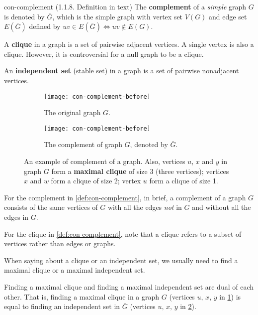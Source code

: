 \documentclass[../src/handouts/main.tex]{subfiles}
\begin{document}
\begin{definition}{}{con-complement}
  (1.1.8. Definition in text)
  The \textbf{complement} of a \textit{simple} graph $G$ is denoted by $\bar G$, which is the simple graph with vertex set $V(G)$ and edge set $E(\bar G)$ defined by $uv \in E(\bar G) \iff uv \notin E(G)$.

  A \textbf{clique} in a graph is a set of pairwise adjacent vertices. A single vertex is also a clique. However, it is controversial for a null graph to be a clique.

  An \textbf{independent set} (stable set) in a graph is a set of pairwise nonadjacent vertices.
\end{definition}

\begin{figure}[ht]
  \centering
  \begin{subfigure}[t]{.3\textwidth}
    \centering
    \texttt{[image: con-complement-before]}
    \caption{The original graph $G$.}
    \label{fig:con-complement-before}
  \end{subfigure}
  \hspace{.1\textwidth}
  \begin{subfigure}[t]{.3\textwidth}
    \centering
    \texttt{[image: con-complement-before]}
    \caption{The complement of graph $G$, denoted by $\bar G$.}
    \label{fig:con-complement-after}
  \end{subfigure}
  \caption{An example of complement of a graph. Also, vertices $u$, $x$ and $y$ in graph $G$ form a \textbf{maximal clique} of size 3 (three vertices); vertices $x$ and $w$ form a clique of size 2; vertex $u$ form a clique of size 1.}
  \label{fig:con-complement}
\end{figure}

For the complement in \cref{def:con-complement}, in brief, a complement of a graph $G$ consists of the same vertices of $G$ with all the edges \textit{not} in $G$ and without all the edges in $G$.

For the clique in \cref{def:con-complement}, note that a clique refers to a subset of vertices rather than edges or graphs.

When saying about a clique or an independent set, we usually need to find a maximal clique or a maximal independent set.

Finding a maximal clique and finding a maximal independent set are dual of each other. That is, finding a maximal clique in a graph $G$ (vertices $u,\, x,\, y$ in \cref{fig:con-complement-before}) is equal to finding an independent set in $\bar G$ (vertices $u,\, x,\, y$ in \cref{fig:con-complement-after}). 
\end{document}
